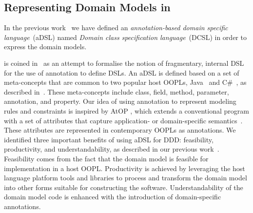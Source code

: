 \subsection{Representing Domain Models in \dcsl}
\label{sect:bg-dcsl}

In the previous work~\cite{le_domain_2018} we have defined an \textit{annotation-based domain specific language}~(aDSL) named \textit{Domain class specification language}~(DCSL) in order to express the domain models. 

 is coined in~\cite{nosal_language_2016} as an attempt to formalise the notion of fragmentary, internal DSL~\cite{fowler_domain-specific_2010} for the use of annotation to define DSLs. %
An aDSL is defined based on a set of meta-concepts that are common to two popular host OOPLs, Java~\cite{gosling_java_2014} and C\#~\cite{hejlsberg_c_2010}, as described in~\cite{le_domain_2018}. These meta-concepts include class, field, method, parameter, annotation, and property. Our idea of using annotation to represent modeling rules and constraints is inspired by AtOP \cite{wada_modeling_2005, cepa_representing_2005,sulir_recording_2016,balz_embedding_2012}, %
which extends a conventional program with a set of attributes that capture application- or domain-specific semantics~\cite{cepa_representing_2005}. These attributes are represented in contemporary OOPLs as annotations. 
%
We identified three important benefits of using aDSL for DDD: feasibility, productivity, and understandability, as described in our previous work~\cite{le_domain_2018}. Feasibility comes from the fact that the domain model is feasible for implementation in a host OOPL. Productivity is achieved by leveraging the host language platform tools and libraries to process and transform the domain model into other forms suitable for constructing the software. Understandability of the domain model code is enhanced with the introduction of domain-specific annotations.

